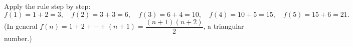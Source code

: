 Apply the rule step by step:
\[
f(1)=1+2=3,\quad f(2)=3+3=6,\quad f(3)=6+4=10,\quad f(4)=10+5=15,\quad f(5)=15+6=\boxed{21}.
\]
(In general $f(n)=1+2+\cdots+(n+1)=\dfrac{(n+1)(n+2)}{2}$, a triangular number.)
